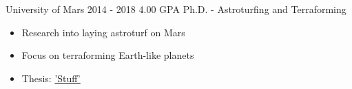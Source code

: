 
\cvevent
	{University of Mars}
	{2014 - 2018}
	{4.00 GPA}
	{Ph.D. - Astroturfing and Terraforming}
	{
    }
	{
        \vspace{-6pt}
	    \begin{itemize}
            \item Research into laying astroturf on Mars
            \item Focus on terraforming Earth-like planets
            \item Thesis: \href{google.com}{'Stuff'}
        \end{itemize}
	}
